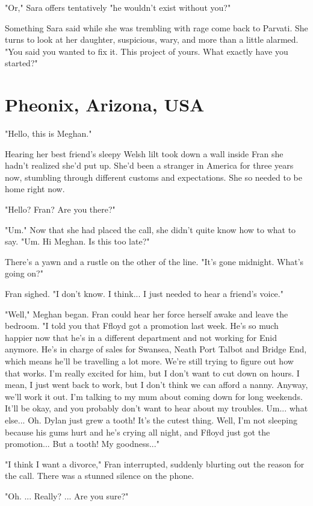\documentclass{article}
\begin{document}
"Or," Sara offers tentatively "he wouldn't exist without you?"

Something Sara said while she was trembling with rage come back to Parvati. She turns to look at her daughter, suspicious, wary, and more than a little alarmed. "You said you wanted to fix it. This project of yours. What exactly have you started?"

\section{Pheonix, Arizona, USA}

"Hello, this is Meghan."

Hearing her best friend's sleepy Welsh lilt took down a wall inside Fran she hadn't realized she'd put up. She'd been a stranger in America for three years now, stumbling through different customs and expectations. She so needed to be home right now.

"Hello? Fran? Are you there?"

"Um." Now that she had placed the call, she didn't quite know how to what to say. "Um. Hi Meghan. Is this too late?"

There's a yawn and a rustle on the other of the line. "It's gone midnight. What's going on?"

Fran sighed. "I don't know. I think... I just needed to hear a friend's voice."

"Well," Meghan began. Fran could hear her force herself awake and leave the bedroom. "I told you that Ffloyd got a promotion last week. He's so much happier now that he's in a different department and not working for Enid anymore. He's in charge of sales for Swansea, Neath Port Talbot and Bridge End, which means he'll be travelling a lot more. We're still trying to figure out how that works. I'm really excited for him, but I don't want to cut down on hours. I mean, I just went back to work, but I don't think we can afford a nanny. Anyway, we'll work it out. I'm talking to my mum about coming down for long weekends. It'll be okay, and you probably don't want to hear about my troubles. Um... what else... Oh. Dylan just grew a tooth! It's the cutest thing. Well, I'm not sleeping because his gums hurt and he's crying all night, and Ffloyd just got the promotion... But a tooth! My goodness..."

"I think I want a divorce," Fran interrupted, suddenly blurting out the reason for the call. There was a stunned silence on the phone. 

"Oh. ... Really? ... Are you sure?"
\end{document}
